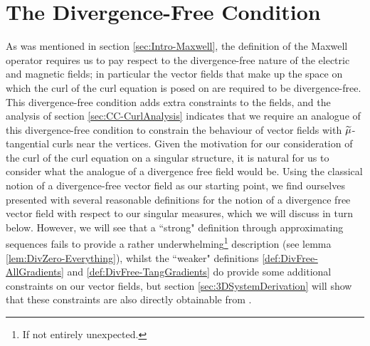 \section{The Divergence-Free Condition} \label{sec:DivFreeCondition}
As was mentioned in section \ref{sec:Intro-Maxwell}, the definition of the Maxwell operator requires us to pay respect to the divergence-free nature of the electric and magnetic fields; in particular the vector fields that make up the space on which the curl of the curl equation is posed on are required to be divergence-free.
This divergence-free condition adds extra constraints to the fields, and the analysis of section \ref{sec:CC-CurlAnalysis} indicates that we require an analogue of this divergence-free condition to constrain the behaviour of vector fields with $\widetilde{\mu}$-tangential curls near the vertices.
Given the motivation for our consideration of the curl of the curl equation on a singular structure, it is natural for us to consider what the analogue of a divergence free field would be.
Using the classical notion of a divergence-free vector field as our starting point, we find ourselves presented with several reasonable definitions for the notion of a divergence free vector field with respect to our singular measures, which we will discuss in turn below.
However, we will see that a ``strong" definition through approximating sequences fails to provide a rather underwhelming\footnote{If not entirely unexpected.} description (see lemma \ref{lem:DivZero-Everything}), whilst the ``weaker" definitions \ref{def:DivFree-AllGradients} and \ref{def:DivFree-TangGradients} do provide some additional constraints on our vector fields, but section \ref{sec:3DSystemDerivation} will show that these constraints are also directly obtainable from .


